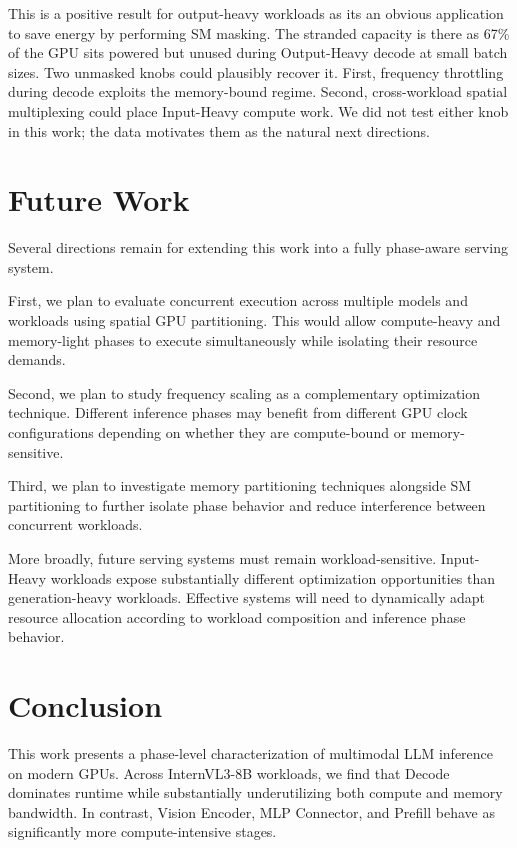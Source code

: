 \documentclass[10pt,twocolumn]{article}
\begin{document}
This is a positive result for output-heavy workloads as its an obvious application to save energy by performing SM masking. The stranded capacity is there as 67\% of the GPU sits powered but unused during Output-Heavy decode at small batch sizes. Two unmasked knobs could plausibly recover it. First, frequency throttling during decode exploits the memory-bound regime. Second, cross-workload spatial multiplexing could place Input-Heavy compute work. We did not test either knob in this work; the data motivates them as the natural next directions.

\section{Future Work}

Several directions remain for extending this work into a fully phase-aware serving system.

First, we plan to evaluate concurrent execution across multiple models and workloads using spatial GPU partitioning. This would allow compute-heavy and memory-light phases to execute simultaneously while isolating their resource demands.

Second, we plan to study frequency scaling as a complementary optimization technique. Different inference phases may benefit from different GPU clock configurations depending on whether they are compute-bound or memory-sensitive.

Third, we plan to investigate memory partitioning techniques alongside SM partitioning to further isolate phase behavior and reduce interference between concurrent workloads.

More broadly, future serving systems must remain workload-sensitive. Input-Heavy workloads expose substantially different optimization opportunities than generation-heavy workloads. Effective systems will need to dynamically adapt resource allocation according to workload composition and inference phase behavior.

\section{Conclusion}

This work presents a phase-level characterization of multimodal LLM inference on modern GPUs. Across InternVL3-8B workloads, we find that Decode dominates runtime while substantially underutilizing both compute and memory bandwidth. In contrast, Vision Encoder, MLP Connector, and Prefill behave as significantly more compute-intensive stages.
\end{document}
